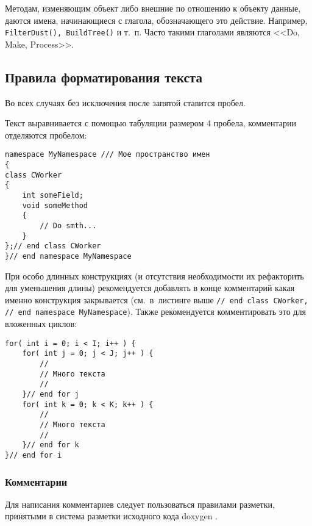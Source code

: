 Методам, изменяющим объект либо внешние по отношению к объекту данные, даются имена, начинающиеся с глагола, обозначающего это действие. Например, \lstinline|FilterDust(), BuildTree()| и т.~п. Часто такими глаголами являются <<Do, Make, Process>>.

\newpage
\subsection{Правила форматирования текста}

Во всех случаях без исключения после запятой ставится пробел.

Текст выравнивается с помощью табуляции размером 4 пробела, комментарии отделяются пробелом:

\begin{lstlisting}[frame=single,showspaces=true,showstringspaces=true]
namespace MyNamespace /// Мое пространство имен
{
class CWorker
{
    int someField;
    void someMethod
    {
        // Do smth...
    }
};// end class CWorker
}// end namespace MyNamespace
\end{lstlisting}

При особо длинных конструкциях (и отсутствия необходимости их рефакторить для уменьшения длины) рекомендуется добавлять в конце комментарий какая именно конструкция закрывается (см.~в~листинге выше \lstinline|// end class CWorker, // end namespace MyNamespace|). Также рекомендуется комментировать это для вложенных циклов:
\begin{lstlisting}[frame=single]
for( int i = 0; i < I; i++ ) {
    for( int j = 0; j < J; j++ ) {
        //		
		// Много текста
        //
    }// end for j
    for( int k = 0; k < K; k++ ) {
        //		
        // Много текста
        //
    }// end for k
}// end for i
\end{lstlisting}

\newpage
\subsubsection{Комментарии}

Для написания комментариев следует пользоваться правилами разметки, принятыми в система разметки исходного кода doxygen \cite{Doxygen}.

